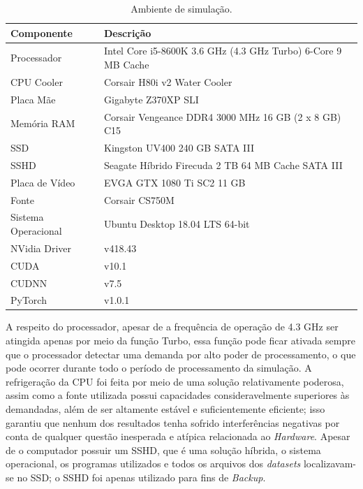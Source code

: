 \begin{table}[H]
    \centering
    \caption{Ambiente de simulação.}
    \begin{tabular}{ll}
        \toprule
        \textbf{Componente} &   \textbf{Descrição}\\
        \midrule
        \rowcolor{mColor1!30}
        Processador         &   Intel Core i5-8600K 3.6 GHz (4.3 GHz Turbo) 6-Core 9 MB Cache\\
        \rowcolor{mColor1!0}
        CPU Cooler          &   Corsair H80i v2 Water Cooler\\
        \rowcolor{mColor1!30}
        Placa Mãe           &   Gigabyte Z370XP SLI\\
        \rowcolor{mColor1!0}
        Memória RAM         &   Corsair Vengeance DDR4 3000 MHz 16 GB (2 
        x 8 GB) C15\\
        \rowcolor{mColor1!30}
        SSD                 &   Kingston UV400 240 GB SATA III\\
        \rowcolor{mColor1!0}
        SSHD                &   Seagate Híbrido Firecuda 2 TB 64 MB Cache 
        SATA III\\
        \rowcolor{mColor1!30}
        Placa de Vídeo      &   EVGA GTX 1080 Ti SC2 11 GB\\
        \rowcolor{mColor1!0}
        Fonte               &   Corsair CS750M\\
        \rowcolor{mColor1!30}
        Sistema Operacional &   Ubuntu Desktop 18.04 LTS 64-bit\\
        \rowcolor{mColor1!0}
        NVidia Driver       &   v418.43\\
        \rowcolor{mColor1!30}
        CUDA                &   v10.1\\
        \rowcolor{mColor1!0}
        CUDNN               &   v7.5\\
        \rowcolor{mColor1!30}
        PyTorch             &   v1.0.1\\
        \bottomrule
    \end{tabular}
    \label{tab:results_pc_specs}
\end{table}

A respeito do processador, apesar de a frequência de operação de 4.3 GHz ser atingida apenas por meio da função Turbo, essa função pode ficar ativada sempre que o processador detectar uma demanda por alto poder de processamento, o que pode ocorrer durante todo o período de processamento da simulação. A refrigeração da CPU foi feita por meio de uma solução relativamente poderosa, assim como a fonte utilizada possui capacidades consideravelmente superiores às demandadas, além de ser altamente estável e suficientemente eficiente; isso garantiu que nenhum dos resultados tenha sofrido interferências negativas por conta de qualquer questão inesperada e atípica relacionada ao \textit{Hardware}. Apesar de o computador possuir um SSHD, que é uma solução híbrida, o sistema operacional, os programas utilizados e todos os arquivos dos \textit{datasets} localizavam-se no SSD; o SSHD foi apenas utilizado para fins de \textit{Backup}.

